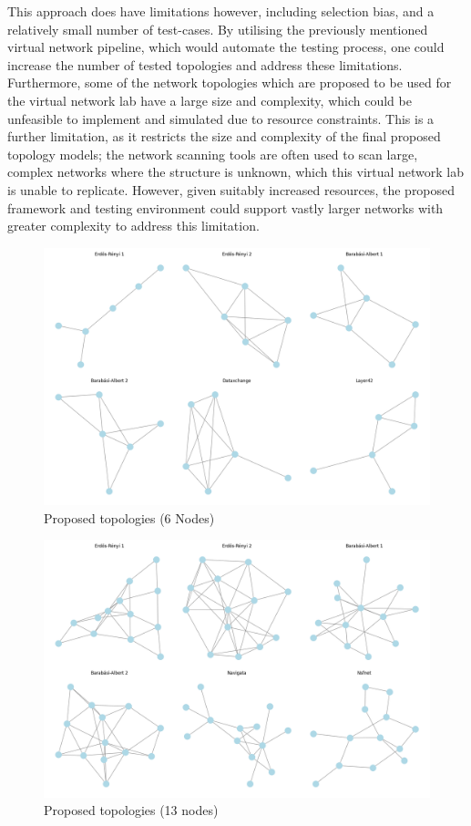 This approach does have limitations however, including selection bias, and a relatively small number of test-cases. By utilising the previously mentioned virtual network pipeline, which would automate the testing process, one could increase the number of tested topologies and address these limitations. Furthermore, some of the network topologies which are proposed to be used for the virtual network lab have a large size and complexity, which could be unfeasible to implement and simulated due to resource constraints. 
This is a further limitation, as it restricts the size and complexity of the final proposed topology models; the network scanning tools are often used to scan large, complex networks where the structure is unknown, which this virtual network lab is unable to replicate. However, given suitably increased resources, the proposed framework and testing environment could support vastly larger networks with greater complexity to address this limitation. 

\begin{figure}
    \centering
    \includegraphics[width=0.8\linewidth]{images/Topology set/6.png}
    \caption{Proposed topologies (6 Nodes)}
    \label{fig:6_prop}
\end{figure}

\begin{figure}
    \centering
    \includegraphics[width=0.8\linewidth]{images/Topology set/13.png}
    \caption{Proposed topologies (13 nodes)}
    \label{fig:13_prop}
\end{figure}

